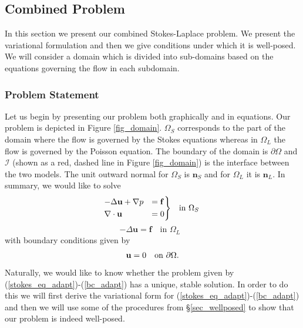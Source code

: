 \documentclass[12pt,a4paper]{article}
\theoremstyle{definition}
\begin{document}
\subsection{Combined Problem}\label{sec_adaptivity}
In this section we present our combined Stokes-Laplace problem.  We present the variational formulation and then we give conditions under which it is well-posed.  We will consider a domain which is divided into sub-domains based on the equations governing the flow in each subdomain.
\subsubsection{Problem Statement}
Let us begin by presenting our problem both graphically and in equations.  Our problem is depicted in Figure \ref{fig_domain}.  $\Omega_S$ corresponds to the part of the domain where the flow is governed by the Stokes equations whereas in $\Omega_L$ the flow is governed by the Poisson equation.  The boundary of the domain is $\partial\Omega$ and $\mathcal{I}$ (shown as a red, dashed line in Figure \ref{fig_domain}) is the interface between the two models.  The unit outward normal for $\Omega_S$ is $\textbf{n}_S$ and for $\Omega_L$ it is $\textbf{n}_L$.  In summary, we would like to solve
\begin{equation}
	\begin{aligned}\label{stokes_eq_adapt}
\begin{rcases}
-\Delta\textbf{u} + \nabla p &= \textbf{f} \\ 
\nabla\cdot \textbf{u}&= 0
\end{rcases}
	\end{aligned}
	\quad \text{in $\Omega_{S}$ }  
\end{equation}
\begin{equation}\label{poisson_eq_adapt}
-\Delta\textbf{u}= \textbf{f}\quad \text{in $\Omega_{L}$ }
\end{equation}
with boundary conditions given by
\begin{equation}\label{bc_adapt}
	\textbf{u}= 0 \text{\quad on $\partial \Omega$}.
\end{equation}
Naturally, we would like to know whether the problem given by (\ref{stokes_eq_adapt})-(\ref{bc_adapt}) has a unique, stable solution.  In order to do this we will first derive the variational form for (\ref{stokes_eq_adapt})-(\ref{bc_adapt}) and then we will use some of the procedures from \S \ref{sec_wellposed} to show that our problem is indeed well-posed.
\end{document}
